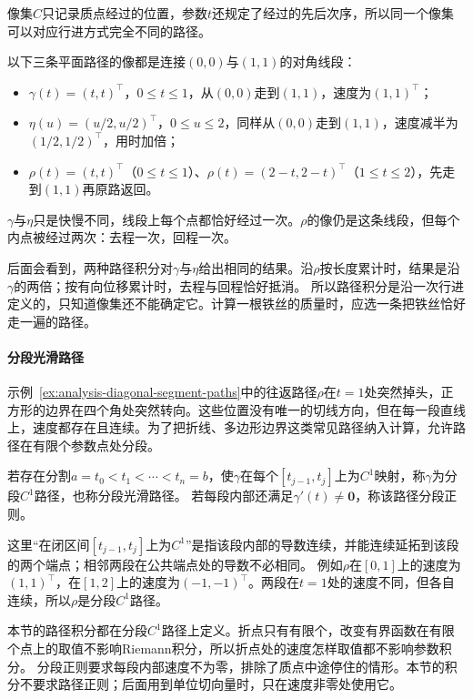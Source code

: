 像集$C$只记录质点经过的位置，参数$t$还规定了经过的先后次序，所以同一个像集可以对应行进方式完全不同的路径。
\begin{example}[同一条对角线段上的三条路径]
\label{ex:analysis-diagonal-segment-paths}
以下三条平面路径的像都是连接$(0,0)$与$(1,1)$的对角线段：
\begin{itemize}
 \item $\gamma(t)=(t,t)^\top$，$0\leq t\leq1$，从$(0,0)$走到$(1,1)$，速度为$(1,1)^\top$；
 \item $\eta(u)=(u/2,u/2)^\top$，$0\leq u\leq2$，同样从$(0,0)$走到$(1,1)$，速度减半为$(1/2,1/2)^\top$，用时加倍；
 \item $\rho(t)=(t,t)^\top$（$0\leq t\leq1$）、$\rho(t)=(2-t,2-t)^\top$（$1\leq t\leq2$），先走到$(1,1)$再原路返回。
\end{itemize}
$\gamma$与$\eta$只是快慢不同，线段上每个点都恰好经过一次。$\rho$的像仍是这条线段，但每个内点被经过两次：去程一次，回程一次。
\end{example}

后面会看到，两种路径积分对$\gamma$与$\eta$给出相同的结果。沿$\rho$按长度累计时，结果是沿$\gamma$的两倍；按有向位移累计时，去程与回程恰好抵消。
所以路径积分是沿一次行进定义的，只知道像集还不能确定它。计算一根铁丝的质量时，应选一条把铁丝恰好走一遍的路径。

\paragraph{分段光滑路径}

示例~\ref{ex:analysis-diagonal-segment-paths}中的往返路径$\rho$在$t=1$处突然掉头，正方形的边界在四个角处突然转向。这些位置没有唯一的切线方向，但在每一段直线上，速度都存在且连续。为了把折线、多边形边界这类常见路径纳入计算，允许路径在有限个参数点处分段。
\begin{definition}[分段光滑路径]
若存在分割$a=t_0<t_1<\cdots<t_n=b$，使$\gamma$在每个$[t_{j-1},t_j]$上为$C^1$映射，称$\gamma$为分段$C^1$路径，也称分段光滑路径。
若每段内部还满足$\gamma'(t)\neq\bm0$，称该路径分段正则。
\end{definition}

这里“在闭区间$[t_{j-1},t_j]$上为$C^1$”是指该段内部的导数连续，并能连续延拓到该段的两个端点；相邻两段在公共端点处的导数不必相同。
例如$\rho$在$[0,1]$上的速度为$(1,1)^\top$，在$[1,2]$上的速度为$(-1,-1)^\top$。两段在$t=1$处的速度不同，但各自连续，所以$\rho$是分段$C^1$路径。

本节的路径积分都在分段$C^1$路径上定义。折点只有有限个，改变有界函数在有限个点上的取值不影响Riemann积分，所以折点处的速度怎样取值都不影响参数积分。
分段正则要求每段内部速度不为零，排除了质点中途停住的情形。本节的积分不要求路径正则；后面用到单位切向量时，只在速度非零处使用它。

